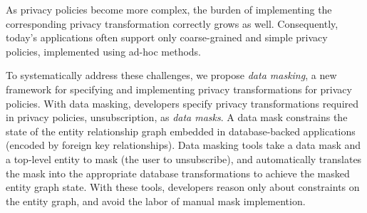 As privacy policies become more complex, the burden of implementing the corresponding privacy
transformation correctly grows as well.
Consequently, today's applications often support only coarse-grained and simple privacy policies,
implemented using ad-hoc methods.


To systematically address these challenges, we propose \emph{data masking}, a new framework for
specifying and implementing privacy transformations for privacy policies.
%
With data masking, developers specify privacy transformations required in privacy policies, \eg
unsubscription, as \emph{data masks}. A data mask constrains the state of the entity relationship
graph embedded in database-backed applications (\eg encoded by foreign key relationships).
%
Data masking tools take a data mask and a top-level entity to mask (\eg the user to
unsubscribe), and automatically translates the mask into the appropriate database transformations to
achieve the masked entity graph state. With these tools, developers reason only about constraints on
the entity graph, and avoid the labor of manual mask implemention.

